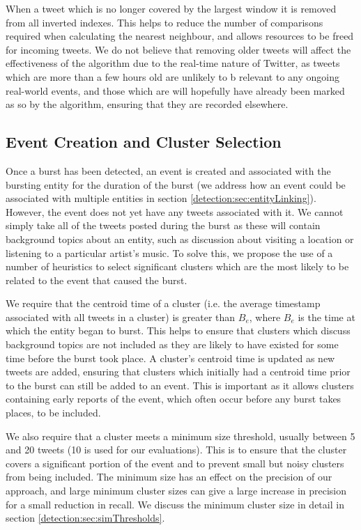 When a tweet which is no longer covered by the largest window it is removed from all inverted indexes.
This helps to reduce the number of comparisons required when calculating the nearest neighbour, and allows resources to be freed for incoming tweets.
We do not believe that removing older tweets will affect the effectiveness of the algorithm due to the real-time nature of Twitter, as tweets which are more than a few hours old are unlikely to b relevant to any ongoing real-world events, and those which are will hopefully have already been marked as so by the algorithm, ensuring that they are recorded elsewhere.

\subsection{Event Creation and Cluster Selection}
\label{detection:sec:eventCreation}
Once a burst has been detected, an event is created and associated with the bursting entity for the duration of the burst (we address how an event could be associated with multiple entities in section \ref{detection:sec:entityLinking}).
However, the event does not yet have any tweets associated with it.
We cannot simply take all of the tweets posted during the burst as these will contain background topics about an entity, such as discussion about visiting a location or listening to a particular artist's music. To solve this, we propose the use of a number of heuristics to select significant clusters which are the most likely to be related to the event that caused the burst.

We require that the centroid time of a cluster (i.e. the average timestamp associated with all tweets in a cluster) is greater than \(B_e\), where \(B_e\) is the time at which the entity began to burst. This helps to ensure that clusters which discuss background topics are not included as they are likely to have existed for some time before the burst took place. A cluster's centroid time is updated as new tweets are added, ensuring that clusters which initially had a centroid time prior to the burst can still be added to an event. This is important as it allows clusters containing early reports of the event, which often occur before any burst takes places, to be included.

We also require that a cluster meets a minimum size threshold, usually between 5 and 20 tweets (10 is used for our evaluations).
This is to ensure that the cluster covers a significant portion of the event and to prevent small but noisy clusters from being included. The minimum size has an effect on the precision of our approach, and large minimum cluster sizes can give a large increase in precision for a small reduction in recall. We discuss the minimum cluster size in detail in section \ref{detection:sec:simThresholds}.

